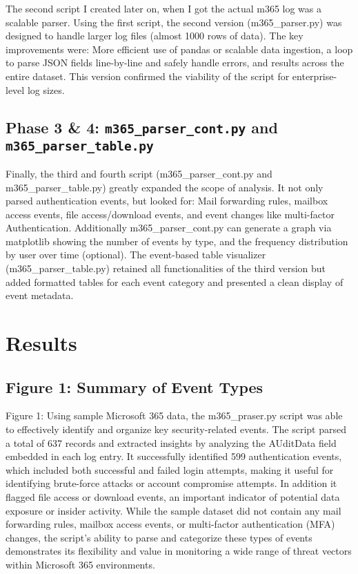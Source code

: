 \documentclass[12pt]{article}
\begin{document}
The second script I created later on, when I got the actual m365 log was a scalable parser. Using the first script, the second version (m365\_parser.py) was designed to handle larger log files (almost 1000 rows of data). The key improvements were: More efficient use of pandas or scalable data ingestion, a loop to parse JSON fields line-by-line and safely handle errors, and results across the entire dataset. This version confirmed the viability of the script for enterprise-level log sizes.

\subsection{Phase 3 \& 4: \texttt{m365\_parser\_cont.py} and \texttt{m365\_parser\_table.py}}

Finally, the third and fourth script (m365\_parser\_cont.py and m365\_parser\_table.py) greatly expanded the scope of analysis. It not only parsed authentication events, but looked for: Mail forwarding rules, mailbox access events, file access/download events, and event changes like multi-factor Authentication. Additionally m365\_parser\_cont.py can generate a graph via matplotlib showing the number of events by type, and the frequency distribution by user over time (optional). The event-based table visualizer (m365\_parser\_table.py) retained all functionalities of the third version but added formatted tables for each event category and presented a clean display of event metadata.

\section{Results}

\subsection*{Figure 1: Summary of Event Types}

Figure 1: Using sample Microsoft 365 data, the m365\_praser.py script was able to effectively identify and organize key security-related events. The script parsed a total of 637 records and extracted insights by analyzing the AUditData field embedded in each log entry. It successfully identified 599 authentication events, which included both successful and failed login attempts, making it useful for identifying brute-force attacks or account compromise attempts. In addition it flagged file access or download events, an important indicator of potential data exposure or insider activity. While the sample dataset did not contain any mail forwarding rules, mailbox access events, or multi-factor authentication (MFA) changes, the script's ability to parse and categorize these types of events demonstrates its flexibility and value in monitoring a wide range of threat vectors within Microsoft 365 environments.
\end{document}
